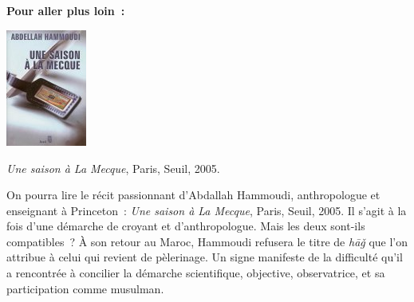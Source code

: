 \textbf{Pour aller plus loin~:}
\begin{marginfigure}
    

    \centering
    \includegraphics[width=1.04167in,height=1.51389in]{Images/image067.jpg}
    \caption{\emph{Une saison à La Mecque}, Paris, Seuil,
2005.}
    
\end{marginfigure}
On pourra lire le récit passionnant d'Abdallah Hammoudi, anthropologue
et enseignant à Princeton~: \emph{Une saison à La Mecque}, Paris, Seuil,
2005. Il s'agit à la fois d'une démarche de croyant et d'anthropologue.
Mais les deux sont-ils compatibles~? À son retour au Maroc, Hammoudi
refusera le titre de \emph{hāǧ} que l'on attribue à celui qui revient de
pèlerinage. Un signe manifeste de la difficulté qu'il a rencontrée à
concilier la démarche scientifique, objective, observatrice, et sa
participation comme musulman.


 